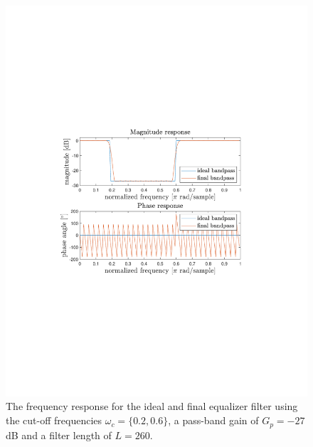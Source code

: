 \documentclass[journal]{IEEEtran}
\begin{document}
\begin{figure}
    \centering
    \includegraphics[width=\columnwidth]{assignment_02/plots/equalizer.pdf}
    \caption{The frequency response for the ideal and final equalizer filter using the cut-off frequencies $\omega_c=\{0.2,0.6\}$, a pass-band gain of $G_p=-27$ dB and a filter length of $L=260$.}
    \label{fig:eq}
\end{figure}
\end{document}
